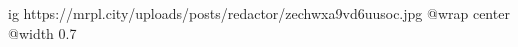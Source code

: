  
 
 
 
 

\ifcmt
  ig https://mrpl.city/uploads/posts/redactor/zechwxa9vd6uusoc.jpg
  @wrap center
  @width 0.7
\fi
